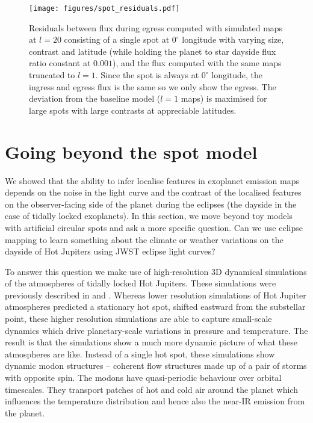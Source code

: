 \documentclass[12pt,dvipsnames]{report}
\begin{document}
\begin{figure}[t!]
    \begin{centering}
        \texttt{[image: figures/spot\_residuals.pdf]}
        \caption{
            Residuals between flux during egress computed with simulated maps at $l=20$ consisting of a single spot at
            $0^\circ$ longitude with varying size, contrast and latitude (while holding the planet to star
            dayside flux ratio constant at $0.001$), and the flux computed with the same maps truncated to
            $l=1$.
            Since the spot is always at $0^\circ$ longitude, the ingress and egress flux is the same
            so we only show the egress.
            The deviation from the baseline model ($l=1$ maps) is maximised for large spots with large
            contrasts at appreciable latitudes.
        }
        \label{fig:spot_residuals}
    \end{centering}
\end{figure}

\section{Going beyond the spot model}
\label{sec:exo_weather}
We showed that the ability to infer localise features in exoplanet emission maps 
depends on the noise in the light curve
and the contrast of the localised features on the observer-facing side of the planet 
during the eclipses (the dayside in the case of tidally locked exoplanets). In this 
section, we move beyond toy models with artificial circular spots and ask a more 
specific question. Can we use eclipse mapping to learn something about the climate
or weather variations on the dayside of Hot Jupiters using JWST eclipse light curves? 

To answer this question we make use of high-resolution 3D dynamical simulations of 
the atmospheres of tidally locked Hot Jupiters. These simulations were previously 
described in \citet{2022MNRAS.511.3584S} and \citet{2021ApJ...913L..32C}. 
Whereas lower resolution simulations of Hot Jupiter atmospheres predicted a stationary 
hot spot, shifted eastward from the substellar point, these higher resolution simulations
are able to capture small-scale dynamics which drive planetary-scale variations 
in pressure and temperature. The result is that the simulations show a much more 
dynamic picture of what these atmospheres are like. Instead of a single hot spot, 
these simulations show dynamic modon structures -- coherent flow structures made up of 
a pair of storms with opposite spin. The modons have quasi-periodic behaviour over 
orbital timescales. They transport patches of hot and cold air around the planet  
which influences the temperature distribution and hence also the near-IR emission 
from the planet.
\end{document}
